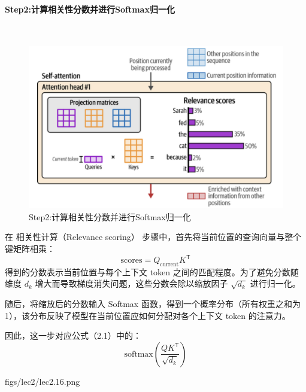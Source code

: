 \paragraph{Step2:计算相关性分数并进行Softmax归一化}~{}
\begin{figure}[htbp]
  \centering
  \includegraphics[width=0.8\linewidth]{figs/lec2/lec2.14.png}
  \caption{Step2:计算相关性分数并进行Softmax归一化}
  \label{fig:Step2:计算相关性分数并进行Softmax归一化}
\end{figure}

在 {\color{qpurple}相关性计算（Relevance scoring）} 步骤中，首先将当前位置的查询向量与整个键矩阵相乘：
\[
\text{scores} = Q_{\text{current}} K^\mathsf{T}
\]
得到的分数表示当前位置与每个上下文 token 之间的匹配程度。为了避免分数随维度 $d_k$ 增大而导致梯度消失问题，这些分数会除以缩放因子 $\sqrt{d_k}$ 进行归一化。  

随后，将缩放后的分数输入 Softmax 函数，得到一个概率分布（所有权重之和为 1），该分布反映了模型在当前位置应如何分配对各个上下文 token 的注意力。  

因此，这一步对应公式（2.1）中的：
\[
\text{softmax}\left(\frac{QK^\mathsf{T}}{\sqrt{d_k}}\right)
\]

\MarginImageWithNote
{figs/lec2/lec2.16.png}
{\label{fig:TeacherForcing}}
{
\label{def:teacher-forcing}

\label{def:auto-regressive}

}

